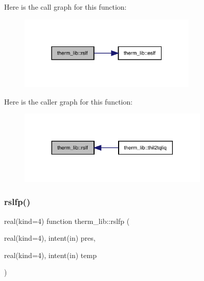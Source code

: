 Here is the call graph for this function\+:
\nopagebreak
\begin{figure}[H]
\begin{center}
\leavevmode
\includegraphics[width=241pt]{namespacetherm__lib_abd775a071488452f724ab50c60cebe4b_cgraph}
\end{center}
\end{figure}
Here is the caller graph for this function\+:
\nopagebreak
\begin{figure}[H]
\begin{center}
\leavevmode
\includegraphics[width=257pt]{namespacetherm__lib_abd775a071488452f724ab50c60cebe4b_icgraph}
\end{center}
\end{figure}
\mbox{\label{namespacetherm__lib_ae0635cd1cd9e80dafd1cb89243c41e02}} 
\subsubsection{\texorpdfstring{rslfp()}{rslfp()}}
{\footnotesize\ttfamily real(kind=4) function therm\+\_\+lib\+::rslfp (\begin{DoxyParamCaption}\item[{real(kind=4), intent(in)}]{pres,  }\item[{real(kind=4), intent(in)}]{temp }\end{DoxyParamCaption})}

